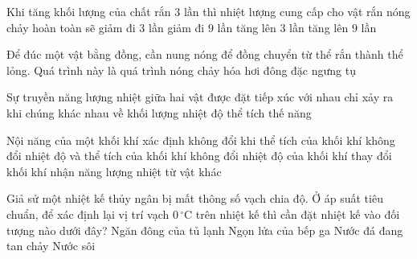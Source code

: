 \begin{ex}
\begin{minipage}[t]{0.29\linewidth}
		\end{minipage}
	\end{ex}

	\begin{ex}%
		Khi tăng khối lượng của chất rắn $3$ lần thì nhiệt lượng cung cấp cho vật rắn nóng chảy hoàn toàn sẽ
		\choice
		{giảm đi $3$ lần}
		{giảm đi $9$ lần}
		{\True tăng lên $3$ lần}
		{tăng lên $9$ lần}
	\end{ex}

	\begin{ex}%
		Để đúc một vật bằng đồng, cần nung nóng để đồng chuyển từ thể rắn thành thể lỏng. Quá trình này là quá trình
		\choice
		{\True nóng chảy}
		{hóa hơi}
		{đông đặc}
		{ngưng tụ}
	\end{ex}

	\begin{ex}%
		Sự truyền năng lượng nhiệt giữa hai vật được đặt tiếp xúc với nhau chỉ xảy ra khi chúng khác nhau về
		\choice
		{khối lượng}
		{\True nhiệt độ}
		{thể tích}
		{thế năng}
	\end{ex}

	\begin{ex}%
		Nội năng của một khối khí xác định không đổi khi
		\choice
		{thể tích của khối khí không đổi}
		{\True nhiệt độ và thể tích của khối khí không đổi}
		{nhiệt độ của khối khí thay đổi}
		{khối khí nhận năng lượng nhiệt từ vật khác}
	\end{ex}

	\begin{ex}%
		Giả sử một nhiệt kế thủy ngân bị mất thông số vạch chia độ. Ở áp suất tiêu chuẩn, để xác định lại vị trí vạch $0\,^\circ\text{C}$ trên nhiệt kế thì cần đặt nhiệt kế vào đối tượng nào dưới đây?
		\choice
		{Ngăn đông của tủ lạnh}
		{Ngọn lửa của bếp ga}
		{\True Nước đá đang tan chảy}
		{Nước sôi}
	\end{ex}

